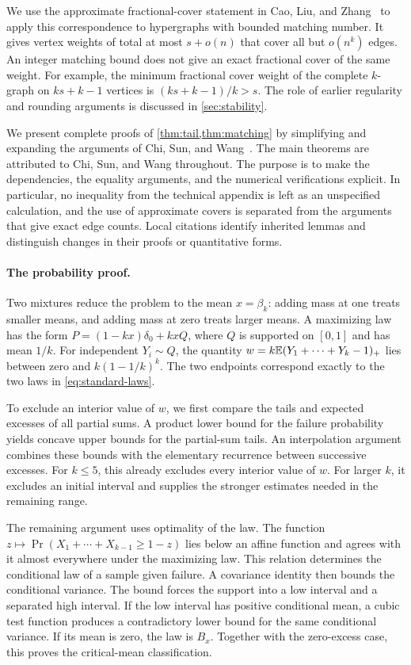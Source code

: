 We use the approximate fractional-cover statement in Cao, Liu, and Zhang~\cite[Lemma 3.2]{CLZ2026} to apply this correspondence to hypergraphs with bounded matching number. It gives vertex weights of total at most $s+o(n)$ that cover all but $o(n^k)$ edges. An integer matching bound does not give an exact fractional cover of the same weight. For example, the minimum fractional cover weight of the complete $k$-graph on $ks+k-1$ vertices is $(ks+k-1)/k>s$. The role of earlier regularity and rounding arguments is discussed in \cref{sec:stability}.

We present complete proofs of \cref{thm:tail,thm:matching} by simplifying and expanding the arguments of Chi, Sun, and Wang~\cite{CSW2026}. The main theorems are attributed to Chi, Sun, and Wang throughout. The purpose is to make the dependencies, the equality arguments, and the numerical verifications explicit. In particular, no inequality from the technical appendix is left as an unspecified calculation, and the use of approximate covers is separated from the arguments that give exact edge counts. Local citations identify inherited lemmas and distinguish changes in their proofs or quantitative forms.

\paragraph{The probability proof.}
Two mixtures reduce the problem to the mean $x=\beta_k$: adding mass at one treats smaller means, and adding mass at zero treats larger means. A maximizing law has the form $P=(1-kx)\delta_0+kxQ$, where $Q$ is supported on $[0,1]$ and has mean $1/k$. For independent $Y_i\sim Q$, the quantity $w=k\mathbb E(Y_1+\cdots+Y_k-1)_+$ lies between zero and $k(1-1/k)^k$. The two endpoints correspond exactly to the two laws in \cref{eq:standard-laws}.

To exclude an interior value of $w$, we first compare the tails and expected excesses of all partial sums. A product lower bound for the failure probability yields concave upper bounds for the partial-sum tails. An interpolation argument combines these bounds with the elementary recurrence between successive excesses. For $k\le5$, this already excludes every interior value of $w$. For larger $k$, it excludes an initial interval and supplies the stronger estimates needed in the remaining range.

The remaining argument uses optimality of the law. The function $z\mapsto\Pr(X_1+\cdots+X_{k-1}\ge1-z)$ lies below an affine function and agrees with it almost everywhere under the maximizing law. This relation determines the conditional law of a sample given failure. A covariance identity then bounds the conditional variance. The bound forces the support into a low interval and a separated high interval. If the low interval has positive conditional mean, a cubic test function produces a contradictory lower bound for the same conditional variance. If its mean is zero, the law is $B_x$. Together with the zero-excess case, this proves the critical-mean classification.

